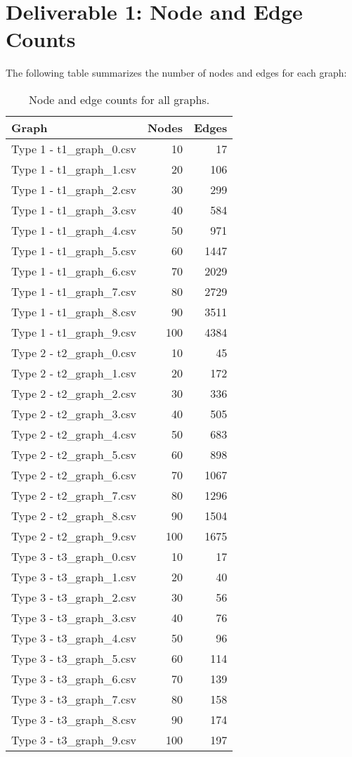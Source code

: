 \documentclass{article}
\begin{document}
\newpage
\section*{Deliverable 1: Node and Edge Counts}
The following table summarizes the number of nodes and edges for each graph:
\vspace{.5cm}
\begin{table}[h!]
\centering
\begin{tabular}{lrr}
\toprule
\textbf{Graph} & \textbf{Nodes} & \textbf{Edges} \\
\midrule
Type 1 - t1\_graph\_0.csv & 10 & 17 \\
Type 1 - t1\_graph\_1.csv & 20 & 106 \\
Type 1 - t1\_graph\_2.csv & 30 & 299 \\
Type 1 - t1\_graph\_3.csv & 40 & 584 \\
Type 1 - t1\_graph\_4.csv & 50 & 971 \\
Type 1 - t1\_graph\_5.csv & 60 & 1447 \\
Type 1 - t1\_graph\_6.csv & 70 & 2029 \\
Type 1 - t1\_graph\_7.csv & 80 & 2729 \\
Type 1 - t1\_graph\_8.csv & 90 & 3511 \\
Type 1 - t1\_graph\_9.csv & 100 & 4384 \\
\hline
Type 2 - t2\_graph\_0.csv & 10 & 45 \\
Type 2 - t2\_graph\_1.csv & 20 & 172 \\
Type 2 - t2\_graph\_2.csv & 30 & 336 \\
Type 2 - t2\_graph\_3.csv & 40 & 505 \\
Type 2 - t2\_graph\_4.csv & 50 & 683 \\
Type 2 - t2\_graph\_5.csv & 60 & 898 \\
Type 2 - t2\_graph\_6.csv & 70 & 1067 \\
Type 2 - t2\_graph\_7.csv & 80 & 1296 \\
Type 2 - t2\_graph\_8.csv & 90 & 1504 \\
Type 2 - t2\_graph\_9.csv & 100 & 1675 \\
\hline
Type 3 - t3\_graph\_0.csv & 10 & 17 \\
Type 3 - t3\_graph\_1.csv & 20 & 40 \\
Type 3 - t3\_graph\_2.csv & 30 & 56 \\
Type 3 - t3\_graph\_3.csv & 40 & 76 \\
Type 3 - t3\_graph\_4.csv & 50 & 96 \\
Type 3 - t3\_graph\_5.csv & 60 & 114 \\
Type 3 - t3\_graph\_6.csv & 70 & 139 \\
Type 3 - t3\_graph\_7.csv & 80 & 158 \\
Type 3 - t3\_graph\_8.csv & 90 & 174 \\
Type 3 - t3\_graph\_9.csv & 100 & 197 \\
\bottomrule
\end{tabular}
\caption{Node and edge counts for all graphs.}
\label{tab:node_edge_counts}
\end{table}
\end{document}
